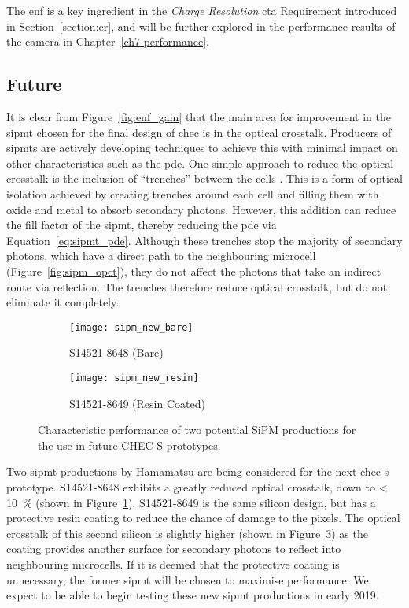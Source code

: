 The \gls{enf} is a key ingredient in the \textit{Charge Resolution} \gls{cta} Requirement introduced in Section~\ref{section:cr}, and will be further explored in the performance results of the camera in Chapter~\ref{ch7-performance}.

\subsection{Future} \label{section:sipmt_future}

It is clear from Figure~\ref{fig:enf_gain} that the main area for improvement in the \gls{sipmt} chosen for the final design of \gls{chec} is in the optical crosstalk. Producers of \glspl{sipmt} are actively developing techniques to achieve this with minimal impact on other characteristics such as the \gls{pde}. One simple approach to reduce the optical crosstalk is the inclusion of ``trenches'' between the cells \cite{Kindt1998,Pagano2011}. This is a form of optical isolation achieved by creating trenches around each cell and filling them with oxide and metal to absorb secondary photons. However, this addition can reduce the fill factor of the \gls{sipmt}, thereby reducing the \gls{pde} via Equation~\ref{eq:sipmt_pde}. Although these trenches stop the majority of secondary photons, which have a direct path to the neighbouring microcell (Figure~\ref{fig:sipm_opct}), they do not affect the photons that take an indirect route via reflection. The trenches therefore reduce optical crosstalk, but do not eliminate it completely.

\begin{figure}
  \begin{subfigure}[b]{0.49\textwidth}
    \texttt{[image: sipm\_new\_bare]}
    \caption{S14521-8648 (Bare) \cite{Hamamatsu2018a}}
    \label{fig:sipm_new_bare}
  \end{subfigure}
  \hfill
  \begin{subfigure}[b]{0.49\textwidth}
    \texttt{[image: sipm\_new\_resin]}
    \caption{S14521-8649 (Resin Coated) \cite{Hamamatsu2018b}}
    \label{fig:sipm_new_resin}
  \end{subfigure}
  \caption[Characteristic performance of future CHEC-S SiPMs.]{Characteristic performance of two potential SiPM productions for the use in future CHEC-S prototypes.}
\end{figure}

Two \gls{sipmt} productions by Hamamatsu are being considered for the next \gls{chec-s} prototype. S14521-8648 exhibits a greatly reduced optical crosstalk, down to \SI{< 10}{\percent} (shown in Figure~\ref{fig:sipm_new_bare}). S14521-8649 is the same silicon design, but has a protective resin coating to reduce the chance of damage to the pixels. The optical crosstalk of this second silicon is slightly higher (shown in Figure~\ref{fig:sipm_new_resin}) as the coating provides another surface for secondary photons to reflect into neighbouring microcells. If it is deemed that the protective coating is unnecessary, the former \gls{sipmt} will be chosen to maximise performance. We expect to be able to begin testing these new \gls{sipmt} productions in early 2019.


